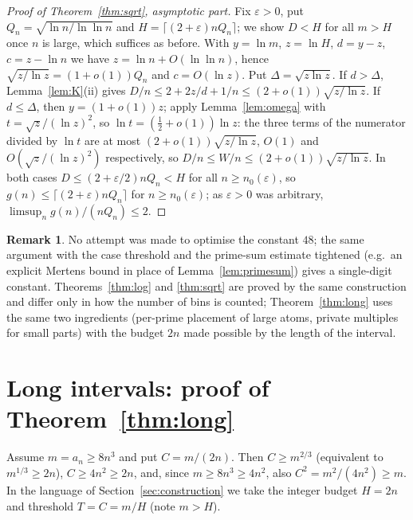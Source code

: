 \documentclass[11pt]{article}
\theoremstyle{definition}
\newtheorem{remark}[theorem]{Remark}
\begin{document}
\begin{proof}[Proof of Theorem~\ref{thm:sqrt}, asymptotic part]
Fix $\varepsilon>0$, put $Q_n=\sqrt{\ln n/\ln\ln n}$ and $H=\lceil(2+\varepsilon)nQ_n\rceil$; we show $D<H$
for all $m>H$ once $n$ is large, which suffices as before. With $y=\ln m$, $z=\ln H$, $d=y-z$, $c=z-\ln n$ we
have $z=\ln n+O(\ln\ln n)$, hence $\sqrt{z/\ln z}=(1+o(1))Q_n$ and $c=O(\ln z)$. Put $\Delta=\sqrt{z\ln z}$.
If $d>\Delta$, Lemma~\ref{lem:K}(ii) gives $D/n\le 2+2z/d+1/n\le(2+o(1))\sqrt{z/\ln z}$. If $d\le\Delta$, then
$y=(1+o(1))z$; apply Lemma~\ref{lem:omega} with $t=\sqrt z/(\ln z)^2$, so $\ln t=(\tfrac12+o(1))\ln z$:
the three terms of the numerator divided by $\ln t$ are at most $(2+o(1))\sqrt{z/\ln z}$, $O(1)$ and
$O(\sqrt z/(\ln z)^2)$ respectively, so $D/n\le W/n\le(2+o(1))\sqrt{z/\ln z}$. In both cases
$D\le(2+\varepsilon/2)nQ_n<H$ for all $n\ge n_0(\varepsilon)$, so $g(n)\le\lceil(2+\varepsilon)nQ_n\rceil$ for
$n\ge n_0(\varepsilon)$; as $\varepsilon>0$ was arbitrary, $\limsup_n g(n)/(nQ_n)\le 2$.
\end{proof}

\begin{remark}
No attempt was made to optimise the constant $48$; the same argument with the case threshold and the
prime-sum estimate tightened (e.g.\ an explicit Mertens bound in place of Lemma~\ref{lem:primesum}) gives
a single-digit constant. Theorems~\ref{thm:log} and \ref{thm:sqrt} are proved by the same construction and
differ only in how the number of bins is counted; Theorem~\ref{thm:long} uses the same two ingredients
(per-prime placement of large atoms, private multiples for small parts) with the budget $2n$ made possible by
the length of the interval.
\end{remark}

\section{Long intervals: proof of Theorem~\ref{thm:long}}\label{sec:long}

Assume $m=a_n\ge 8n^3$ and put $C=m/(2n)$. Then $C\ge m^{2/3}$ (equivalent to $m^{1/3}\ge 2n$),
$C\ge 4n^2\ge 2n$, and, since $m\ge 8n^3\ge 4n^2$, also $C^2=m^2/(4n^2)\ge m$. In the language of
Section~\ref{sec:construction} we take the integer budget $H=2n$ and threshold $T=C=m/H$ (note $m>H$).
\end{document}
